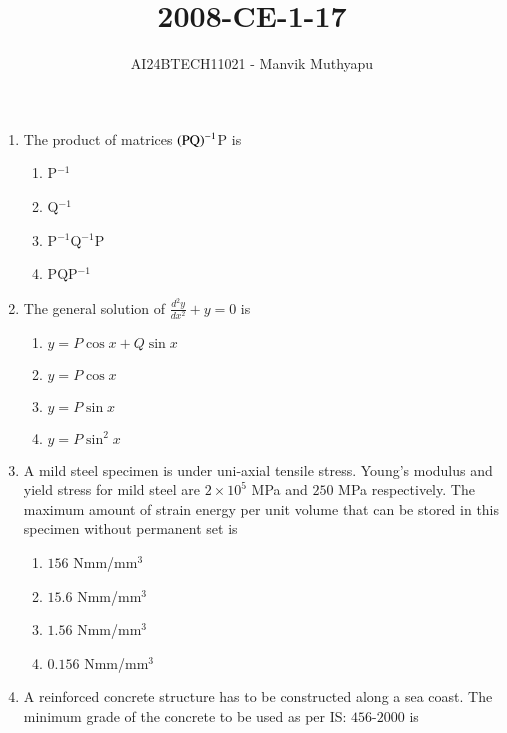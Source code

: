 \documentclass[journal,12pt,onecolumn]{IEEEtran}
\title{2008-CE-1-17}
\author{AI24BTECH11021 - Manvik Muthyapu}
\theoremstyle{remark}
\begin{document}

\maketitle
\bigskip

\renewcommand{\thefigure}{\theenumi}
\renewcommand{\thetable}{\theenumi}

\begin{enumerate}

\item The product of matrices $\left(\text{PQ}\right)^{-1}$P is

\begin{enumerate}

	\item P$^{-1}$
	\item Q$^{-1}$
	\item P$^{-1}$Q$^{-1}$P
	\item PQP$^{-1}$

\end{enumerate}

\item The general solution of $\frac{d^2y}{dx^2} + y = 0$ is

\begin{enumerate}
	\item $y = P\cos{x} + Q\sin{x}$
	\item $y = P\cos{x}$
	\item $y = P\sin{x}$
	\item $y = P\sin^2{x}$
\end{enumerate}

\item A mild steel specimen is under uni-axial tensile stress. Young's modulus and yield stress for mild steel are $2\times10^5$ MPa and $250$ MPa respectively. The maximum amount of strain energy per unit volume that can be stored in this specimen without permanent set is

\begin{enumerate}
	\item $156$ Nmm/mm$^3$
	\item $15.6$ Nmm/mm$^3$
	\item $1.56$ Nmm/mm$^3$
	\item $0.156$ Nmm/mm$^3$
\end{enumerate}

\item A reinforced concrete structure has to be constructed along a sea coast. The minimum grade of the concrete to be used as per IS: $456$-$2000$ is


\end{enumerate}
\end{document}
